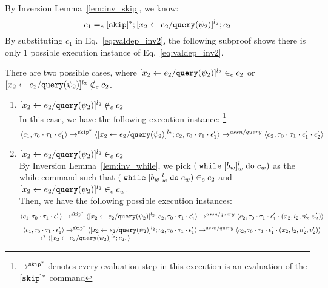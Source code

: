 \begin{subproof}
\[\]
By Inversion Lemma~\ref{lem:inv_skip}, we know:
 \[
 c_1 =_c 
 [\mathtt{skip}]{}^*;[\mathrel{ {x}_2 \leftarrow e_2 / {\tt query}(\psi_2) }]^{l_2};{c}_2
 \]
By substituting $c_1$ in Eq.~\ref{eq:valdep_inv2}, the following subproof shows there is only 1 possible execution instance of Eq.~\ref{eq:valdep_inv2}.
\begin{subproof}[Subproof]
\label{pf:noiteration_inv2}
There are two possible cases, 
where $[\mathrel{ {x}_2 \leftarrow e_2 / {\tt query}(\psi_2) }]^{l_2} \in_c c_2$ 
or $[\mathrel{ {x}_2 \leftarrow e_2 / {\tt query}(\psi_2) }]^{l_2} \notin_c c_2$.
%
\begin{enumerate}
\item{$[\mathrel{ {x}_2 \leftarrow e_2 / {\tt query}(\psi_2) }]^{l_2}\notin_c c_2$}
\\
In this case, we have the following execution instance:
%
\footnote{$\rightarrow^{\mathtt{skip}^*}$ denotes every evaluation step in this execution is an evaluation of the $[\mathtt{skip}]{}^*$ command}
  \[
  \langle c_1, \mathtt{\tau}_0 \cdot \mathtt{\tau}_1 \cdot \mathtt{\epsilon}_1' \rangle 
  \rightarrow^{\mathtt{skip}^*} 
  \langle [\mathrel{ {x}_2 \leftarrow e_2 / {\tt query}(\psi_2) }]^{l_2} ; {c}_2, \mathtt{\tau}_0 \cdot \mathtt{\tau}_1 \cdot \mathtt{\epsilon}_1' \rangle 
  \rightarrow^{assn/query} 
  \langle {c}_2,  \mathtt{\tau}_0 \cdot \mathtt{\tau}_1 \cdot \mathtt{\epsilon}_1' \cdot \mathtt{\epsilon}_2' \rangle 
 \]
%
\item{$[\mathrel{ {x}_2 \leftarrow e_2 / {\tt query}(\psi_2) }]^{l_2} \in_c c_2$}
\\
By Inversion Lemma~\ref{lem:inv_while}, 
we pick $(\;\mathtt{while}\; [b_w]^l_w \;\mathtt{do}\; c_w)$ 
as the while command such that
$(\;\mathtt{while}\; [b_w]^l_w \;\mathtt{do}\; c_w) \in_c c_2$ and 
$[\mathrel{ {x}_2 \leftarrow e_2 / {\tt query}(\psi_2) }]^{l_2} \in_c c_w$.
\\
Then, we have the following possible execution instances:
  \[
  \langle c_1, \mathtt{\tau}_0 \cdot \mathtt{\tau}_1 \cdot \mathtt{\epsilon}_1' \rangle 
  \rightarrow^{\mathtt{skip}^*} 
  \langle [\mathrel{ {x}_2 \leftarrow e_2 / {\tt query}(\psi_2) }]^{l_2} ; {c}_2, \mathtt{\tau}_0 \cdot \mathtt{\tau}_1 \cdot \mathtt{\epsilon}_1' \rangle 
  \rightarrow^{assn/query} 
  \langle {c}_2,  \mathtt{\tau}_0 \cdot \mathtt{\tau}_1 \cdot \mathtt{\epsilon}_1' \cdot (x_2, l_2, n_2', v_2') \rangle 
 \]
%
  \[
  \begin{array}{l}
  \langle c_1, \mathtt{\tau}_0 \cdot \mathtt{\tau}_1 \cdot \mathtt{\epsilon}_1' \rangle 
  \rightarrow^{\mathtt{skip}^*} 
  \langle [\mathrel{ {x}_2 \leftarrow e_2 / {\tt query}(\psi_2) }]^{l_2} ; {c}_2, \mathtt{\tau}_0 \cdot \mathtt{\tau}_1 \cdot \mathtt{\epsilon}_1' \rangle 
  \rightarrow^{assn/query} 
  \langle {c}_2,  \mathtt{\tau}_0 \cdot \mathtt{\tau}_1 \cdot \mathtt{\epsilon}_1' \cdot (x_2, l_2, n_2', v_2') \rangle 
  \\ \qquad
  \rightarrow^{*} 
  \langle [\mathrel{ {x}_2 \leftarrow e_2 / {\tt query}(\psi_2) }]^{l_2} ; {c}_2, 
 \rangle
\end{array}\]
\end{enumerate}
\end{subproof}
\end{subproof}
